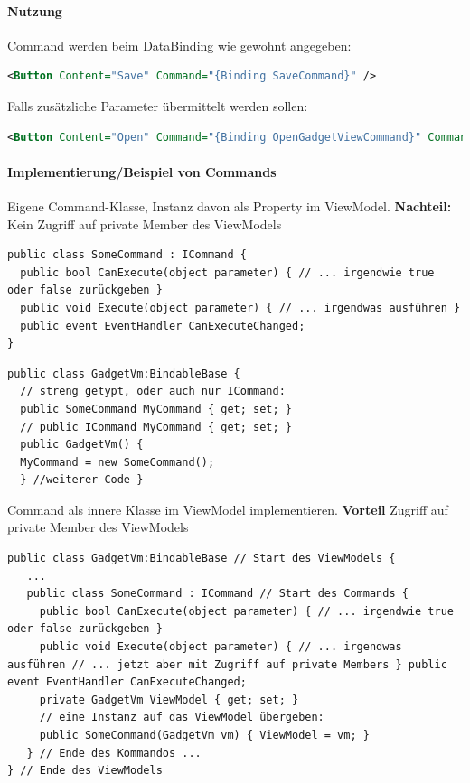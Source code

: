 \paragraph{Nutzung}
Command werden beim DataBinding wie gewohnt angegeben:
\begin{lstlisting}[language=xml]
<Button Content="Save" Command="{Binding SaveCommand}" /> 
\end{lstlisting}
Falls zusätzliche Parameter übermittelt werden sollen:
\begin{lstlisting}[language=xml]
<Button Content="Open" Command="{Binding OpenGadgetViewCommand}" CommandParameter="{Binding SelectedAuto}" /> 
\end{lstlisting}

\paragraph{Implementierung/Beispiel von Commands}

Eigene Command-Klasse, Instanz davon als Property im ViewModel.
\textbf{Nachteil:} Kein Zugriff auf private Member des ViewModels 
\begin{lstlisting}[language=sharpc]
public class SomeCommand : ICommand { 
  public bool CanExecute(object parameter) { // ... irgendwie true oder false zurückgeben }
  public void Execute(object parameter) { // ... irgendwas ausführen } 
  public event EventHandler CanExecuteChanged;
} 
\end{lstlisting}

\begin{lstlisting}[language=sharpc]
public class GadgetVm:BindableBase { 
  // streng getypt, oder auch nur ICommand:
  public SomeCommand MyCommand { get; set; }
  // public ICommand MyCommand { get; set; } 
  public GadgetVm() {
  MyCommand = new SomeCommand(); 
  } //weiterer Code }
\end{lstlisting}

Command als innere Klasse im ViewModel implementieren.
\textbf{Vorteil} Zugriff auf private Member des ViewModels

\begin{lstlisting}[language=sharpc]
public class GadgetVm:BindableBase // Start des ViewModels {
   ...
   public class SomeCommand : ICommand // Start des Commands { 
     public bool CanExecute(object parameter) { // ... irgendwie true oder false zurückgeben }
     public void Execute(object parameter) { // ... irgendwas ausführen // ... jetzt aber mit Zugriff auf private Members } public event EventHandler CanExecuteChanged;
     private GadgetVm ViewModel { get; set; } 
     // eine Instanz auf das ViewModel übergeben:
     public SomeCommand(GadgetVm vm) { ViewModel = vm; } 
   } // Ende des Kommandos ... 
} // Ende des ViewModels 
     
\end{lstlisting}

